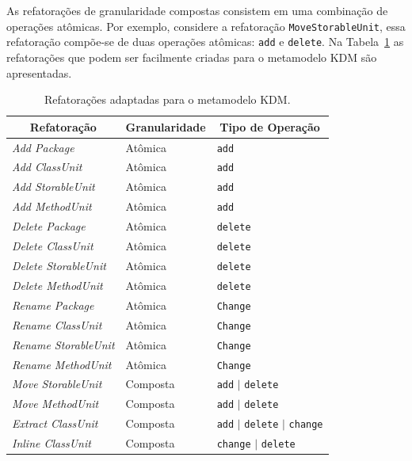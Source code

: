 As refatorações de granularidade compostas consistem em uma combinação de operações atômicas. Por exemplo, considere a refatoração \texttt{MoveStorableUnit}, essa refatoração compõe-se de duas operações atômicas: \texttt{add} e \texttt{delete}. Na Tabela~\ref{tab:refatoringsCatalogo} as refatorações que podem ser facilmente criadas para o metamodelo KDM são apresentadas.

\begin{table}[h]
\caption{Refatorações adaptadas para o metamodelo KDM.\label{tab:refatoringsCatalogo}}
\begin{center}
\begin{tabular}{ | m{4.5cm} | m{2.5cm} | m{4cm}| } 
\hline
\multicolumn{1}{|c|}{Refatoração} & \multicolumn{1}{|c|}{Granularidade} & \multicolumn{1}{|c|}{Tipo de Operação}\\ 
\hline
\textit{Add Package} &  Atômica & \texttt{add}\\ 
\hline
\textit{Add ClassUnit} &  Atômica & \texttt{add}\\ 
\hline
\textit{Add StorableUnit} &  Atômica & \texttt{add}\\ 
\hline
\textit{Add MethodUnit} &  Atômica & \texttt{add}\\ 
\hline
\textit{Delete Package} &  Atômica & \texttt{delete}\\ 
\hline
\textit{Delete ClassUnit} &  Atômica & \texttt{delete}\\ 
\hline
\textit{Delete StorableUnit} &  Atômica & \texttt{delete}\\ 
\hline
\textit{Delete MethodUnit} &  Atômica & \texttt{delete}\\ 
\hline
\textit{Rename Package} &  Atômica & \texttt{Change}\\ 
\hline
\textit{Rename ClassUnit} &  Atômica & \texttt{Change}\\ 
\hline
\textit{Rename StorableUnit} &  Atômica & \texttt{Change}\\ 
\hline
\textit{Rename MethodUnit} &  Atômica & \texttt{Change}\\ 
\hline
\textit{Move StorableUnit} &  Composta & \texttt{add} $|$ \texttt{delete}\\ 
\hline
\textit{Move MethodUnit} &  Composta & \texttt{add} $|$ \texttt{delete}\\ 
\hline
\textit{Extract ClassUnit} &  Composta & \texttt{add} $|$ \texttt{delete} $|$ \texttt{change}\\
\hline
\textit{Inline ClassUnit} &  Composta & \texttt{change} $|$ \texttt{delete}\\ 

\end{tabular}
\end{center}
\end{table}
